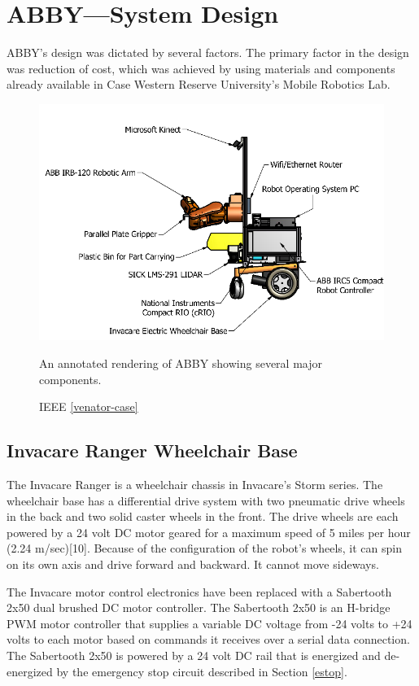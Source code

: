 \documentclass[]{cwru} %
\begin{document}
\chapter{ABBY---System Design}

ABBY's design was dictated by several factors. The primary factor in the
design was reduction of cost, which was achieved by using materials and
components already available in Case Western Reserve University's Mobile
Robotics Lab.

\begin{figure}[h]
\centering
\includegraphics[width=6.0in]{abby-diagram}
\caption{An annotated rendering of ABBY showing several major components.}
\caption*{ IEEE \ref{venator-case}}
\label{abby-diagram}
\end{figure}

\section{Invacare Ranger Wheelchair Base}

The Invacare Ranger is a wheelchair chassis in Invacare's Storm series.
The wheelchair base has a differential drive system with two pneumatic
drive wheels in the back and two solid caster wheels in the front. The
drive wheels are each powered by a 24 volt DC motor geared for a maximum
speed of 5 miles per hour (2.24 m/sec){[}10{]}. Because of the
configuration of the robot's wheels, it can spin on its own axis and
drive forward and backward. It cannot move sideways.

The Invacare motor control electronics have been replaced with a
Sabertooth 2x50 dual brushed DC motor controller. The Sabertooth 2x50 is
an H-bridge PWM motor controller that supplies a variable DC voltage
from -24 volts to +24 volts to each motor based on commands it receives
over a serial data connection. The Sabertooth 2x50 is powered by a 24
volt DC rail that is energized and de-energized by the emergency stop
circuit described in Section \ref{estop}.
\end{document}
